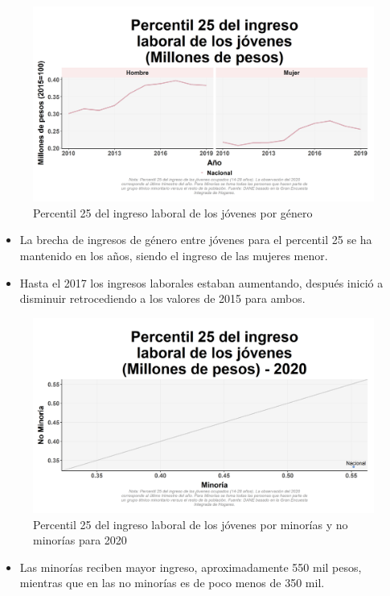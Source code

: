     \begin{figure}[H]
        \caption{Percentil 25 del ingreso laboral de los jóvenes por género \label{map_result_2} }
        \begin{center}
        \includegraphics[width=\textwidth,keepaspectratio]{img/var_12_trend.png}
        \end{center}
    \end{figure}
            \begin{itemize}
                \item La brecha de ingresos de género entre jóvenes para el percentil 25 se ha mantenido en los años, siendo el ingreso de las mujeres menor.
                \item Hasta el 2017 los ingresos laborales estaban aumentando, después inició a disminuir retrocediendo a los valores de 2015 para ambos.
                \end{itemize}

    \begin{figure}[H]
        \caption{Percentil 25 del ingreso laboral de los jóvenes por minorías y no minorías para 2020 \label{map_result_2} }
        \begin{center}
        \includegraphics[width=\textwidth,keepaspectratio]{img/var_11_scatter.png}
        \end{center}
    \end{figure}
            \begin{itemize}
                \item Las minorías reciben mayor ingreso, aproximadamente 550 mil pesos, mientras que en las no minorías es de poco menos de 350 mil.
                \end{itemize}

